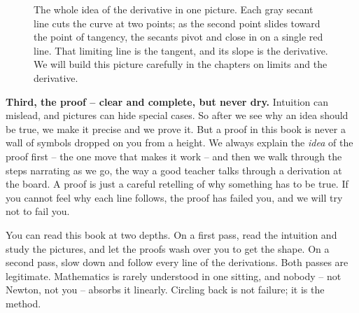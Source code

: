\begin{figure}[h]
\centering
{}
\caption{The whole idea of the derivative in one picture. Each gray secant line cuts the curve at
two points; as the second point slides toward the point of tangency, the secants pivot and close in
on a single red line. That limiting line is the tangent, and its slope is the derivative. We will
build this picture carefully in the chapters on limits and the derivative.}
\label{ch00:secant-tangent}
\end{figure}

\textbf{Third, the proof -- clear and complete, but never dry.} Intuition can mislead, and pictures can
hide special cases. So after we see why an idea should be true, we make it precise and we prove it.
But a proof in this book is never a wall of symbols dropped on you from a height. We always explain
the \emph{idea} of the proof first -- the one move that makes it work -- and then we walk through the
steps narrating as we go, the way a good teacher talks through a derivation at the board. A proof is
just a careful retelling of why something has to be true. If you cannot feel why each line follows,
the proof has failed you, and we will try not to fail you.

\begin{intuitionbox}
You can read this book at two depths. On a first pass, read the intuition and study the pictures,
and let the proofs wash over you to get the shape. On a second pass, slow down and follow every line
of the derivations. Both passes are legitimate. Mathematics is rarely understood in one sitting, and
nobody -- not Newton, not you -- absorbs it linearly. Circling back is not failure; it is the method.
\end{intuitionbox}

